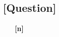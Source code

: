 \documentclass{article}
\newcommand{\bld}{\textbf}
\begin{document}
\subsection*{[Question]}
\begin{enumerate}
  \item[\bld{[n]}]
\end{enumerate}
\end{document}
